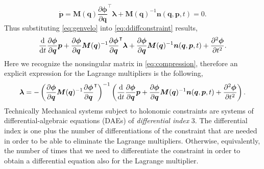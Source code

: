 		\begin{equation}
			\label{eq:genvelo}
			\dot{\bm{p}} = \bm{M}(\bm{q})\frac{\partial\bm{\phi}}{\partial\bm{q}}^{\intercal}\bm{\lambda}+\bm{M}(\bm{q})^{-1}\bm{n}(\bm{q},\bm{p},t) = 0.	
		\end{equation}
		Thus substituting \cref{eq:genvelo} into \cref{eq:ddiffconstraint} results,
		\begin{equation}
			\frac{\mathop{}\!\mathrm{d}}{\mathop{}\!\mathrm{d} t}\frac{\partial\bm{\phi}}{\partial\bm{q}}\bm{p} + \frac{\partial\bm{\phi}}{\partial\bm{q}}\bm{M}(\bm{q})^{-1}\frac{\partial\bm{\phi}}{\partial\bm{q}}^{\intercal}\bm{\lambda}+\frac{\partial\bm{\phi}}{\partial\bm{q}}\bm{M}(\bm{q})^{-1}\bm{n}(\bm{q},\bm{p},t)+\frac{\partial^{2}\bm{\phi}}{\partial t^{2}}.
		\end{equation}
		Here we recognize the nonsingular matrix in \cref{eq:compression}, therefore an explicit expression for the Lagrange multipliers is the following, 
		\begin{equation*}
			\bm{\lambda} = -\left(\frac{\partial\bm{\phi}}{\partial\bm{q}}\bm{M}(\bm{q})^{-1}\frac{\partial\bm{\phi}}{\partial\bm{q}}^{\intercal}\right)^{-1}\left(\frac{\mathop{}\!\mathrm{d}}{\mathop{}\!\mathrm{d} t}\frac{\partial\bm{\phi}}{\partial\bm{q}}\bm{p}+\frac{\partial\bm{\phi}}{\partial\bm{q}}\bm{M}(\bm{q})^{-1}\bm{n}(\bm{q},\bm{p},t)+\frac{\partial^{2}\bm{\phi}}{\partial t^{2}}\right). 
		\end{equation*}
		Technically Mechanical systems subject to holonomic constraints are systems of differential-algebraic equations (DAEs) of \emph{differential index} 3. The differential index is one plus the number of differentiations of the constraint that are needed in order to be able to eliminate the Lagrange multipliers. Otherwise, equivalently, the number of times that we need to differentiate the constraint in order to obtain a differential equation also for the Lagrange multiplier. 
		
